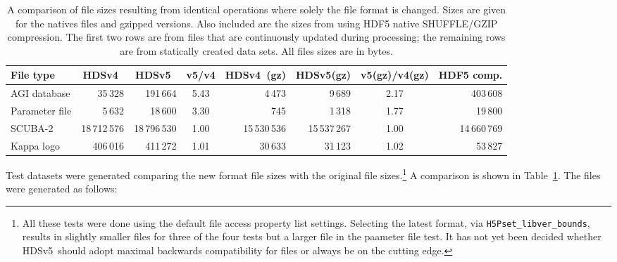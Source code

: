 \documentclass[final,authoryear,5p,times,twocolumn]{elsarticle}
\newcommand{\new}{HDSv5}
\newcommand{\old}{HDSv4}
\begin{document}
\begin{table}[ht]
  \caption{A comparison of file sizes resulting from identical
    operations where solely the file format is changed. Sizes are
    given for the natives files and gzipped versions. Also included
    are the sizes from using HDF5 native SHUFFLE/GZIP compression.
    The first two rows are from files that are continuously updated
    during processing; the remaining rows are from statically created
    data sets. All files sizes are in bytes.}
\label{tab:size}
\begin{center}
\begin{tabular}{lrrcrrcr}
\hline
File type &  \old\ & \new\  & v5/v4 & \old\ (gz) & \new (gz) & v5(gz)/v4(gz)
& HDF5 comp.\\ \hline

AGI database & 35\,328 & 191\,664 & 5.43 & 4\,473 & 9\,689& 2.17  & 403\,608\\
Parameter file & 5\,632 & 18\,600 & 3.30 & 745 & 1\,318 & 1.77 &  19\,800\\
SCUBA-2 & 18\,712\,576 & 18\,796\,530 & 1.00 & 15\,530\,536 &
15\,537\,267 & 1.00 & 14\,660\,769 \\
Kappa logo & 406\,016 & 411\,272 & 1.01 & 30\,633 & 31\,123 & 1.02 & 53\,827\\
\hline
\end{tabular}
\end{center}
\end{table}

Test datasets were generated comparing the new format file sizes with
the original file sizes.\footnote{All these tests were done using the
  default file access property list settings. Selecting the latest
  format, via \texttt{H5Pset\_libver\_bounds}, results in slightly
  smaller files for three of the four tests but a larger file in the
  paameter file test. It has not yet been decided whether \new\ should
  adopt maximal backwards compatibility for files or always be on the cutting
  edge.}  A comparison is shown in
Table~\ref{tab:size}. The files were generated as follows:
\end{document}
